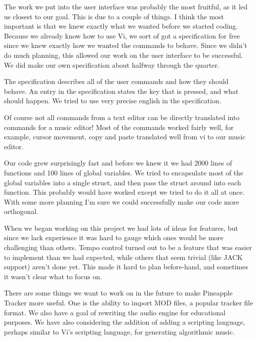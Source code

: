 \documentclass[12pt,letterpaper]{article}
\begin{document}
\par

\par
The work we put into the user interface was probably the most fruitful, as it led us closest to our goal. This is due to a couple of things. I think the most important is that we knew exactly what we wanted before we started coding. Because we already know how to use Vi, we sort of got a specification for free since we knew exactly how we wanted the commands to behave. Since we didn't do much planning, this allowed our work on the user interface to be successful. We did make our own specification about halfway through the quarter.



\par
The specification describes all of the user commands and how they should behave. An entry in the specification states the key that is pressed, and what should happen. We tried to use very precise english in the specification.

\par
Of course not all commands from a text editor can be directly translated into commands for a music editor! Most of the commands worked fairly well, for example, cursor movement, copy and paste translated well from vi to our music editor.

\par
Our code grew surprisingly fast and before we knew it we had 2000 lines of functions and 100 lines of global variables. We tried to encapsulate most of the global variables into a single struct, and then pass the struct around into each function. This probably would have worked except we tried to do it all at once. With some more planning I'm sure we could successfully make our code more orthogonal.

\par
When we began working on this project we had lots of ideas for features, but since we lack experience it was hard to gauge which ones would be more challenging than others. Tempo control turned out to be a feature that was easier to implement than we had expected, while others that seem trivial (like JACK support) aren't done yet. This made it hard to plan before-hand, and sometimes it wasn't clear what to focus on.


\par
There are some things we want to work on in the future to make Pineapple Tracker more useful. One is the ability to import MOD files, a popular tracker file format. We also have a goal of rewriting the audio engine for educational purposes. We have also considering the addition of adding a scripting language, perhaps similar to Vi's scripting language, for generating algorithmic music.
\end{document}
